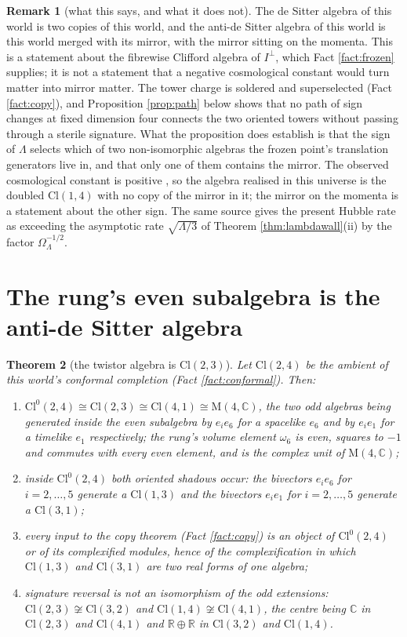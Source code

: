 \documentclass[11pt]{article}
\newtheorem{theorem}{Theorem}[section]
\theoremstyle{definition}
\newtheorem{remark}[theorem]{Remark}
\newcommand{\Cl}{\mathrm{Cl}}
\newcommand{\R}{\mathbb{R}}
\newcommand{\C}{\mathbb{C}}
\newcommand{\Mat}{\mathrm{M}}
\begin{document}
\begin{remark}[what this says, and what it does not]\label{rem:physics}
The de Sitter algebra of this world is two copies of this world, and the anti-de Sitter algebra of this world is this world merged with its mirror, with the mirror sitting on the momenta. This is a statement about the fibrewise Clifford algebra of $I^{\perp}$, which Fact \ref{fact:frozen} supplies; it is not a statement that a negative cosmological constant would turn matter into mirror matter. The tower charge is soldered and superselected (Fact \ref{fact:copy}), and Proposition \ref{prop:path} below shows that no path of sign changes at fixed dimension four connects the two oriented towers without passing through a sterile signature. What the proposition does establish is that the sign of $\Lambda$ selects which of two non-isomorphic algebras the frozen point's translation generators live in, and that only one of them contains the mirror. The observed cosmological constant is positive \cite{Planck2018}, so the algebra realised in this universe is the doubled $\Cl(1,4)$ with no copy of the mirror in it; the mirror on the momenta is a statement about the other sign. The same source gives the present Hubble rate as exceeding the asymptotic rate $\sqrt{\Lambda/3}$ of Theorem \ref{thm:lambdawall}(ii) by the factor $\Omega_{\Lambda}^{-1/2}$.
\end{remark}

\section{The rung's even subalgebra is the anti-de Sitter algebra}\label{sec:rung}

\begin{theorem}[the twistor algebra is $\Cl(2,3)$]\label{thm:rung}
Let $\Cl(2,4)$ be the ambient of this world's conformal completion (Fact \ref{fact:conformal}). Then:
\begin{enumerate}
\item[(i)] $\Cl^{0}(2,4) \cong \Cl(2,3) \cong \Cl(4,1) \cong \Mat(4,\C)$, the two odd algebras being generated inside the even subalgebra by $e_{i}e_{6}$ for a spacelike $e_{6}$ and by $e_{i}e_{1}$ for a timelike $e_{1}$ respectively; the rung's volume element $\omega_{6}$ is even, squares to $-1$ and commutes with every even element, and is the complex unit of $\Mat(4,\C)$;
\item[(ii)] inside $\Cl^{0}(2,4)$ both oriented shadows occur: the bivectors $e_{i}e_{6}$ for $i = 2, \ldots, 5$ generate a $\Cl(1,3)$ and the bivectors $e_{i}e_{1}$ for $i = 2, \ldots, 5$ generate a $\Cl(3,1)$;
\item[(iii)] every input to the copy theorem (Fact \ref{fact:copy}) is an object of $\Cl^{0}(2,4)$ or of its complexified modules, hence of the complexification in which $\Cl(1,3)$ and $\Cl(3,1)$ are two real forms of one algebra;
\item[(iv)] signature reversal is not an isomorphism of the odd extensions: $\Cl(2,3) \not\cong \Cl(3,2)$ and $\Cl(1,4) \not\cong \Cl(4,1)$, the centre being $\C$ in $\Cl(2,3)$ and $\Cl(4,1)$ and $\R \oplus \R$ in $\Cl(3,2)$ and $\Cl(1,4)$.
\end{enumerate}
\end{theorem}
\end{document}
